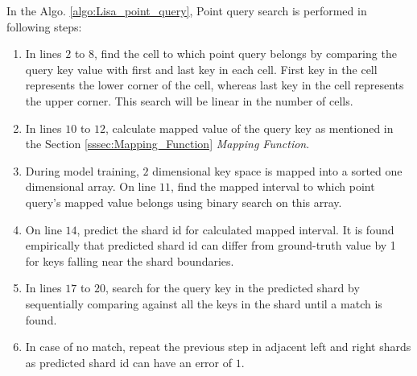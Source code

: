 In the Algo. \ref{algo:Lisa_point_query}, Point query search is performed in following steps:

\begin{enumerate}
	\item In lines $2$ to $8$, find the cell to which point query belongs by comparing the query key value with first and last key in each cell. First key in the cell represents the lower corner of the cell, whereas last key in the cell represents the upper corner. This search will be linear in the number of cells.
	\item In lines $10$ to $12$, calculate mapped value of the query key as mentioned in the Section \ref{sssec:Mapping_Function} \textit{Mapping Function}.
	
	\item During model training, $2$ dimensional key space is mapped into a sorted one dimensional array.  On line $11$, find the mapped interval to which point query's mapped value belongs using binary search on this array.  
	
	\item On line $14$, predict the shard id for calculated mapped interval. It is found empirically that predicted shard id can differ from ground-truth value by 1 for keys falling near the shard boundaries. 
	
	\item In lines $17$ to $20$, search for the query key in the predicted shard by sequentially comparing against all the keys in the shard until a match is found. 
	
	\item In case of no match, repeat the previous step in  adjacent left and right shards as predicted shard id can have an error of $1$. 
\end{enumerate}

